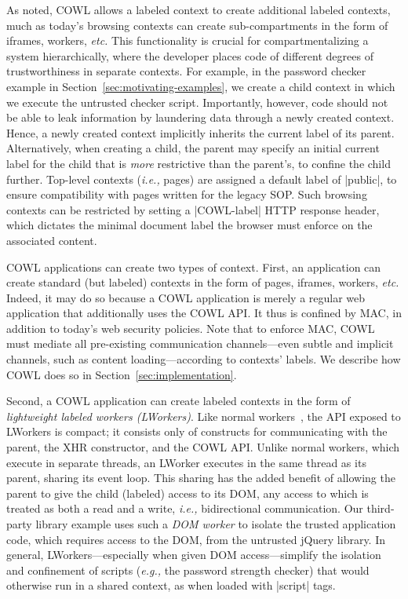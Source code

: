 As noted, COWL allows a labeled context to create additional labeled contexts,
much as today's browsing contexts can create sub-compartments
in the form of iframes, workers, \emph{etc.}
%
This functionality is crucial for compartmentalizing a system
hierarchically, where the developer places code of different degrees
of trustworthiness in separate contexts.
%
For example, in the password checker example in
Section~\ref{sec:motivating-examples}, we create a child context in
which we execute the untrusted checker script.
%
Importantly, however, code should not be able to leak information by
laundering data through a newly created context.
%
Hence, a newly created context implicitly inherits the current label
of its parent.
%
Alternatively, when creating a child, the parent may specify an
initial current label for the child that is {\em more} restrictive
than the parent's, to confine the child further.
%
Top-level contexts (\emph{i.e.,} pages) are assigned a default
label of \js|public|, to ensure compatibility with pages written for
the legacy SOP.
%
Such browsing contexts can be restricted by setting a \js|COWL-label|
HTTP response header, which dictates the minimal document label the
browser must enforce on the associated content.

COWL applications can create two types of context.
%
First, an application can create standard (but labeled) contexts in
the form of pages, iframes, workers, \emph{etc.}
%
Indeed, it may do so because a COWL application is merely a regular
web application that additionally uses the COWL API\@. It thus is
confined by MAC, in addition to today's web security policies.
%
Note that to enforce MAC, COWL must mediate all pre-existing
communication channels---even subtle and implicit channels, such as
content loading---according to contexts' labels.
%
We describe how COWL does so in Section~\ref{sec:implementation}.

Second, a COWL application can create labeled contexts in the form of
\emph{lightweight labeled workers (LWorkers)}.
%
Like normal workers~\cite{workers}, the API exposed to LWorkers is
compact; it consists only of constructs for communicating with
the parent, the XHR constructor, and the COWL API\@.
%
Unlike normal workers, which execute in separate threads, an LWorker
executes in the same thread as its parent, sharing its event loop.
%
This sharing has the added benefit of allowing the parent to give the
child (labeled) access to its DOM, any access to which is treated as
both a read and a write, \emph{i.e.,} bidirectional communication.
%
Our third-party library example uses such a \emph{DOM worker} to
isolate the trusted application code, which requires access to the
DOM, from the untrusted jQuery library.
%
In general, LWorkers---especially when given DOM access---simplify the
isolation and confinement of scripts (\emph{e.g.,} the password strength
checker) that would otherwise run in a shared context, as when loaded
with \js|script| tags.

